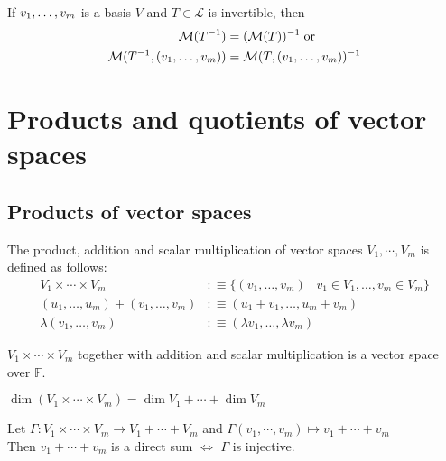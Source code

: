 \setcounter{thm}{85}
\begin{thm}
    If $v_1, \dots, v_m$ is a basis $V$ and $T\in \mathcal{L}$ is invertible, then
    \begin{equation}
    	\begin{aligned}
    		\mathcal{M}(T^{-1}) & = (\mathcal{M}(T))^{-1} \; \text{or} \\
    		\mathcal{M}(T^{-1}, (v_1, \dots, v_m)) & =\mathcal{M}(T, (v_1, \dots, v_m))^{-1}
    	\end{aligned}
    \end{equation}
\end{thm}

\filbreak
\section{Products and quotients of vector spaces}
\subsection{Products of vector spaces}

\begin{mydef}The product, addition and scalar multiplication of vector spaces $V_1, \cdots, V_m$ is defined as follows:
    \begin{equation}
	\begin{aligned}
		V_1 \times \cdots \times V_m &:\equiv \{ (v_1, \dots, v_m) \mid v_1 \in V_1, \dots, v_m \in V_m\} \\
		(u_1, \dots, u_m) + (v_1, \dots, v_m) &:\equiv (u_1+v_1, \dots, u_m+v_m) \\
		\lambda (v_1, \dots, v_m) &:\equiv (\lambda v_1, \dots, \lambda v_m)
	\end{aligned}
\end{equation}
\end{mydef}

\setcounter{thm}{88}
\begin{thm}
    $V_1 \times \cdots \times V_m$ together with addition and scalar multiplication is a vector space over $\mathbb{F}$.
\end{thm}

\setcounter{thm}{91}
\begin{thm}
    $\dim (V_1 \times \cdots \times V_m) = \dim V_1 + \cdots + \dim V_m$
\end{thm}

\begin{thm}
    Let $\Gamma: V_1 \times \cdots \times V_m \to V_1 + \cdots + V_m$ and
    $ \Gamma(v_1, \cdots, v_m) \mapsto v_1 + \cdots + v_m$ \\
Then $v_1 + \cdots + v_m$ is a direct sum $\iff$ $\Gamma$ is injective.
\end{thm}

